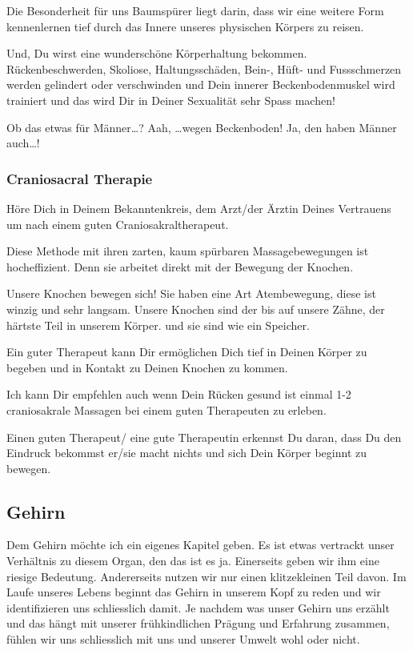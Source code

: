 \documentclass[11pt,titlepage,a5paper]{book}
\begin{document}
Die Besonderheit für uns Baumspürer liegt darin, dass wir eine weitere Form kennenlernen tief durch das Innere unseres physischen Körpers zu reisen.

Und, Du wirst eine wunderschöne Körperhaltung bekommen. Rückenbeschwerden, Skoliose, Haltungsschäden, Bein-, Hüft- und Fussschmerzen werden gelindert oder verschwinden und Dein innerer Beckenbodenmuskel wird trainiert und das wird Dir in Deiner Sexualität sehr Spass machen! 

Ob das etwas für Männer\dots ? Aah, \dots wegen Beckenboden! Ja, den haben Männer auch\dots ! 

\subsubsection{Craniosacral Therapie}

Höre Dich in Deinem Bekanntenkreis, dem Arzt/der Ärztin Deines Vertrauens um nach einem guten Craniosakraltherapeut.

Diese Methode mit ihren zarten, kaum spürbaren Massagebewegungen ist hocheffizient. Denn sie arbeitet direkt mit der Bewegung der Knochen.

Unsere Knochen bewegen sich! Sie haben eine Art Atembewegung, diese ist winzig und sehr langsam. Unsere Knochen sind der bis auf unsere Zähne, der härtste Teil in unserem Körper. und sie sind wie ein Speicher.

Ein guter Therapeut kann Dir ermöglichen Dich tief in Deinen Körper zu begeben und in Kontakt zu Deinen Knochen zu kommen. 

Ich kann Dir empfehlen auch wenn Dein Rücken gesund ist einmal 1-2 craniosakrale Massagen bei einem guten Therapeuten zu erleben.

Einen guten Therapeut/ eine gute Therapeutin erkennst Du daran, dass Du den Eindruck bekommst er/sie macht nichts und sich Dein Körper beginnt zu bewegen.

\subsection{Gehirn}

Dem Gehirn möchte ich ein eigenes Kapitel geben. Es ist etwas vertrackt unser Verhältnis zu diesem Organ, den das ist es ja. Einerseits geben wir ihm eine riesige Bedeutung. Andererseits nutzen wir nur einen klitzekleinen Teil davon. Im Laufe unseres Lebens beginnt das Gehirn in unserem Kopf zu reden und wir identifizieren uns schliesslich damit. Je nachdem was unser Gehirn uns erzählt und das hängt mit unserer frühkindlichen Prägung und Erfahrung zusammen, fühlen wir uns schliesslich mit uns und unserer Umwelt wohl oder nicht.
\end{document}
